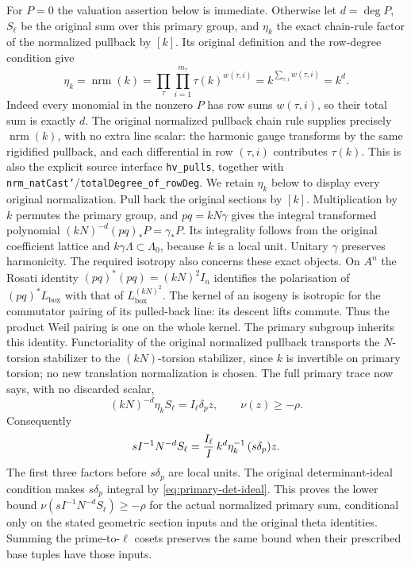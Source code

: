 For $P=0$ the valuation assertion below is immediate.  Otherwise let
$d=\deg P$, $S_\ell$ be the original sum over this primary group,
and $\eta_k$ the exact chain-rule factor of the normalized pullback by
$[k]$.  Its original definition and the row-degree condition give
\[
 \eta_k=\operatorname{nrm}(k)
 =\prod_\tau\prod_{i=1}^{m_\tau}\tau(k)^{w(\tau,i)}
 =k^{\sum_{\tau,i}w(\tau,i)}=k^d.
\]
Indeed every monomial in the nonzero $P$ has row sums $w(\tau,i)$,
so their total sum is exactly $d$.  The original normalized pullback
chain rule supplies precisely $\operatorname{nrm}(k)$, with no extra
line scalar: the harmonic gauge transforms by the same rigidified
pullback, and each differential in row $(\tau,i)$ contributes
$\tau(k)$.  This is also the explicit source interface
\texttt{hv\_pulls}, together with
\texttt{nrm\_natCast'}/\texttt{totalDegree\_of\_rowDeg}.
We retain $\eta_k$ below to display every original normalization.  Pull back the original
sections by $[k]$.  Multiplication by $k$ permutes the primary group,
and $pq=kN\gamma$ gives the integral transformed polynomial
$(kN)^{-d}(pq)_*P=\gamma_*P$.  Its integrality follows from the
original coefficient lattice and $k\gamma\Lambda\subset\Lambda_0$,
because $k$ is a local unit.  Unitary $\gamma$ preserves harmonicity.
The required isotropy also concerns these exact objects.  On $A^n$ the
Rosati identity $(pq)^*(pq)=(kN)^2I_n$ identifies the polarisation
of $(pq)^*L_{\mathrm{box}}$ with that of
$L_{\mathrm{box}}^{(kN)^2}$.  The kernel of an isogeny is isotropic
for the commutator pairing of its pulled-back line: its descent lifts
commute.  Thus the product Weil pairing is one on the whole kernel.
The primary subgroup inherits this identity.  Functoriality of the
original normalized pullback transports the $N$-torsion stabilizer
to the $(kN)$-torsion stabilizer, since $k$ is invertible on primary
torsion; no new translation normalization is chosen.
The full primary trace now says, with no discarded scalar,
\[
       (kN)^{-d}\eta_k S_\ell=I_\ell\delta_p z,
                         \qquad \nu(z)\geq-\rho.
\]
Consequently
\begin{equation}\label{eq:primary-normalized-cancellation}
 s I^{-1}N^{-d}S_\ell
   ={I_\ell\over I}\,k^d\eta_k^{-1}\,(s\delta_p)z.
\end{equation}
The first three factors before $s\delta_p$ are local units.
The original determinant-ideal condition makes $s\delta_p$ integral
by \eqref{eq:primary-det-ideal}.  This proves the lower bound
$\nu(sI^{-1}N^{-d}S_\ell)\geq-\rho$ for the actual normalized primary
sum, conditional only on the stated geometric section inputs and the
original theta identities.  Summing the prime-to-$\ell$ cosets preserves
the same bound when their prescribed base tuples have those inputs.

